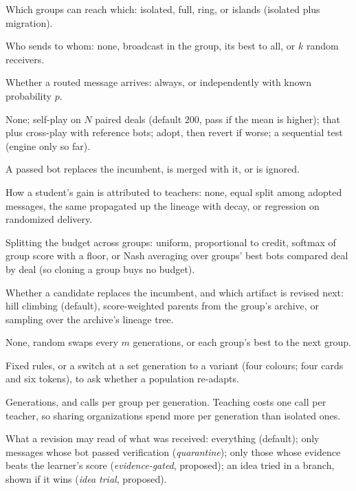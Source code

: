 \documentclass[11pt]{article}
\numberwithin{theorem}{section}
\theoremstyle{definition}
\begin{document}
\begin{description}[leftmargin=0pt,itemsep=0pt]
\item[Topology.] Which groups can reach which: isolated, full, ring, or islands (isolated plus migration).
\item[Routing.] Who sends to whom: none, broadcast in the group, its best to all, or $k$ random receivers.
\item[Delivery.] Whether a routed message arrives: always, or independently with known probability $p$.
\item[Verification.] None; self-play on $N$ paired deals (default $200$, pass if the mean is higher); that plus
cross-play with reference bots; adopt, then revert if worse; a sequential test (engine only so far).
\item[Adoption.] A passed bot replaces the incumbent, is merged with it, or is ignored.
\item[Credit.] How a student's gain is attributed to teachers: none, equal split among adopted messages, the same
propagated up the lineage with decay, or regression on randomized delivery.
\item[Allocation.] Splitting the budget across groups: uniform, proportional to credit, softmax of group score
with a floor, or Nash averaging over groups' best bots compared deal by deal (so cloning a group buys no budget).
\item[Selection.] Whether a candidate replaces the incumbent, and which artifact is revised next: hill climbing
(default), score-weighted parents from the group's archive, or sampling over the archive's lineage tree.
\item[Migration.] None, random swaps every $m$ generations, or each group's best to the next group.
\item[Environment change.] Fixed rules, or a switch at a set generation to a variant (four colours; four cards and six
tokens), to ask whether a population re-adapts.
\item[Horizon and budget.] Generations, and calls per group per generation. Teaching costs one call per teacher, so
sharing organizations spend more per generation than isolated ones.
\item[Reaction rule.] What a revision may read of what was received: everything (default); only messages whose bot
passed verification (\emph{quarantine}); only those whose evidence beats the learner's score (\emph{evidence-gated},
proposed); an idea tried in a branch, shown if it wins (\emph{idea trial}, proposed).
\end{description}
\end{document}
